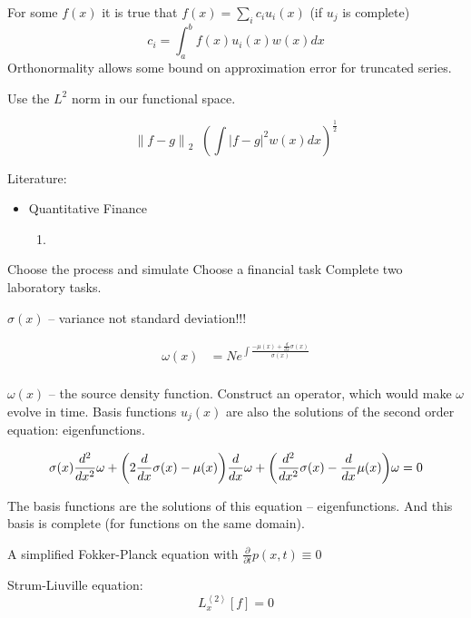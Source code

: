 \documentclass[a4paper]{article}
\newcommand{\clo}[1]{{\left [ #1 \right ]}}
\newcommand{\brac}[1]{{\left ( #1 \right )}}
\newcommand{\abs}[1]{{\left | #1 \right |}}
\newcommand{\nrm}[1]{{\left\| #1 \right \|}}
\newcommand{\brkt}[1]{{\left\langle #1 \right\rangle}}
\newcommand{\defn}{\mathop{\overset{\Delta}{=}}\nolimits}
\begin{document}
For some $f(x)$  it is true that $f(x) = \sum_i c_i u_i(x)$ (if $u_j$ is complete) \[
c_i = \int_a^b f(x)u_i(x)w(x)dx
\]
Orthonormality allows some bound on approximation error for truncated series.

Use the $L^2$ norm in our functional space.

\[\nrm{f-g}_2 \defn \brac{\int \abs{f-g}^2 w(x) dx}^\frac{1}{2}\]



Literature:
\begin{itemize}
	\item Quantitative Finance
	\begin{enumerate}
		\item 
	\end{enumerate}
\end{itemize}

Choose the process and simulate
Choose a financial task
Complete two laboratory tasks.

$\sigma(x)$ -- variance not standard deviation!!!

\begin{align*}
	\omega(x) &= N e^{\int \frac{ - \mu(x) + \frac{d}{dx} \sigma(x)}{\sigma(x)}}\\
\end{align*}

$\omega(x)$ -- the source density function. Construct an operator, which would make $\omega$ evolve in time.
Basis functions $u_j(x)$ are also the solutions of the second order equation: eigenfunctions. 

\[
  \sigma(x) \frac{d^2}{dx^2} \omega \\
+ \brac{ 2\frac{d}{dx}\sigma(x) - \mu(x) } \frac{d}{dx} \omega \\
+ \brac{ \frac{d^2}{dx^2}\sigma(x) - \frac{d}{dx}\mu(x) } \omega \\
= 0
\]

The basis functions are the solutions of this equation -- eigenfunctions.
And this basis is complete (for functions on the same domain).

A simplified Fokker-Planck equation with $ \frac{\partial}{\partial t} p(x,t) \equiv 0$


Strum-Liuville equation:
\[L_x^\brkt{2}\clo{f} = 0\]
\end{document}
